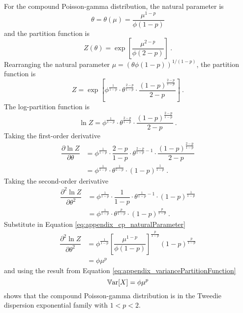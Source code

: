 For the compound Poisson-gamma distribution, the natural parameter is
\begin{equation}
  \theta = \theta(\mu) = \dfrac{\mu^{1-p}}{\phi(1-p)}
  \label{eq:appendix_cp_naturalParameter}
\end{equation}
and the partition function is
\begin{equation*}
  Z(\theta) = 
  \exp\left[
    \frac{\mu^{2-p}}{\phi(2-p)}
  \right]
  \ .
\end{equation*}
Rearranging the natural parameter $\mu=(\theta\phi(1-p))^{1/(1-p)}$, the partition function is
\begin{equation}
  Z = \exp\left[
    \phi^{\frac{1}{1-p}}
    \cdot
    \theta^{\frac{2-p}{1-p}}
    \cdot
    \dfrac{
      (1-p)^{\frac{2-p}{1-p}}
    }{
      2-p
    }
  \right]
  \ .
\end{equation}
The log-partition function is
\begin{equation}
  \ln Z = \phi^{\frac{1}{1-p}}
    \cdot
    \theta^{\frac{2-p}{1-p}}
    \cdot
    \dfrac{
      (1-p)^{\frac{2-p}{1-p}}
    }{
      2-p
    }
  \ .
\end{equation}
Taking the first-order derivative
\begin{align}
  \dfrac{\partial \ln Z}{\partial \theta} &=
  \phi^{\frac{1}{1-p}}
  \cdot
  \dfrac{2-p}{1-p}\cdot\theta^{\frac{2-p}{1-p}-1}
  \cdot
  \dfrac{(1-p)^\frac{2-p}{1-p}}{2-p}
  \nonumber \\
  &= \phi^{\frac{1}{1-p}} \cdot \theta^{\frac{1}{1-p}} \cdot (1-p)^\frac{1}{1-p} \ .
\end{align}
Taking the second-order derivative
\begin{align}
  \dfrac{\partial^2 \ln Z}{\partial \theta^2} &=
  \phi^{\frac{1}{1-p}}
  \cdot
  \dfrac{1}{1-p}\cdot\theta^{\frac{1}{1-p}-1}
  \cdot
  (1-p)^\frac{1}{1-p}
  \nonumber \\
  &=
  \phi^{\frac{1}{1-p}}
  \cdot
  \theta^{\frac{p}{1-p}}
  \cdot
  (1-p)^\frac{p}{1-p} \ .
\end{align}
Substitute in Equation \eqref{eq:appendix_cp_naturalParameter}
\begin{align*}
  \dfrac{\partial^2 \ln Z}{\partial \theta^2} &=
  \phi^{\frac{1}{1-p}}
  \left[\dfrac{\mu^{1-p}}{\phi(1-p)}\right]^{\frac{p}{1-p}}
  (1-p)^\frac{p}{1-p}
  \nonumber \\
  & = \phi \mu^p
\end{align*}
and using the result from Equation \eqref{eq:appendix_variancePartitionFunction}
\begin{equation}
 \operatorname{\mathbb{V}ar}[X] = \phi \mu^p
\end{equation}
shows that the compound Poisson-gamma distribution is in the Tweedie dispersion exponential family with $1<p<2$.

